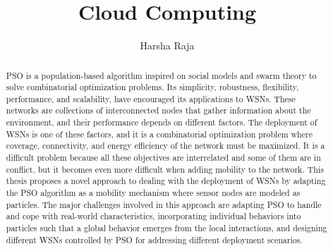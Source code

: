 \documentclass[11pt, a4paper, twoside, openright]{report}
\title{Cloud Computing}
\author{Harsha Raja}
\begin{document}
\frontmatter

 

\begin{abstract}
\small

\ac{PSO} is a population-based algorithm inspired on social models and
swarm theory to solve combinatorial optimization problems.  Its simplicity,
robustness, flexibility, performance, and scalability, have encouraged its
applications to \acp{WSN}.  These networks are collections of interconnected
nodes that gather information about the environment, and their performance
	depends on different factors. The deployment of
	\acp{WSN} is one of these factors, and it is a combinatorial optimization
	problem where coverage, connectivity, and  energy efficiency of the network
	must be maximized.  It is a difficult problem because all these objectives are
	interrelated and some of them are in conflict, but it becomes even 
	 more difficult when adding mobility to the  network. This thesis proposes a
	 novel approach to dealing with the deployment of \acp{WSN} by adapting the
 	\ac{PSO} algorithm  as a mobility mechanism  where sensor nodes are modeled as
 	particles. The major challenges involved in this approach are adapting
 	\ac{PSO} to handle and cope with real-world characteristics, incorporating
 	individual behaviors into particles such that a global behavior emerges from
 	the local interactions, and designing different \acp{WSN} controlled by
 	\ac{PSO} for addressing different deployment scenarios.

  
\end{abstract}
\end{document}
